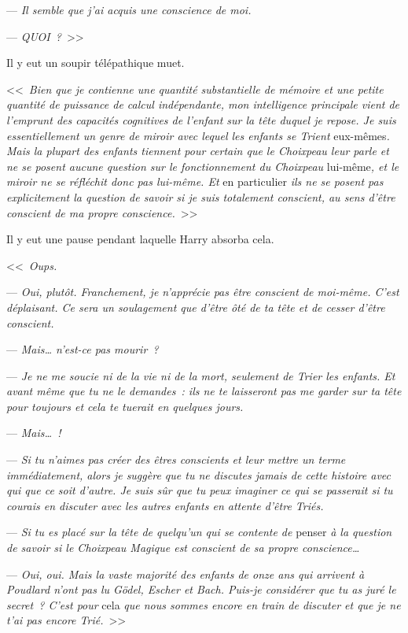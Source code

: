 

\hplettrineextrapara
--- \emph{Il semble que j'ai acquis une conscience de moi.}

--- \emph{QUOI~?}~>>

Il y eut un soupir télépathique muet.

<<~\emph{Bien que je contienne une quantité substantielle de mémoire et une petite quantité de puissance de calcul indépendante, mon intelligence principale vient de l'emprunt des capacités cognitives de l'enfant sur la tête duquel je repose. Je suis essentiellement un genre de miroir avec lequel les enfants se Trient} eux-mêmes\emph{. Mais la plupart des enfants tiennent pour certain que le Choixpeau leur parle et ne se posent aucune question sur le fonctionnement du Choixpeau} lui-même\emph{, et le miroir ne se réfléchit donc pas lui-même. Et} en particulier \emph{ils ne se posent pas explicitement la question de savoir si je suis totalement conscient, au sens d'être conscient de ma propre conscience.}~>>

Il y eut une pause pendant laquelle Harry absorba cela.

<<~\emph{Oups.}

--- \emph{Oui, plutôt. Franchement, je n'apprécie pas être conscient de moi-même. C'est déplaisant. Ce sera un soulagement que d'être ôté de ta tête et de cesser d'être conscient.}

--- \emph{Mais… n'est-ce pas mourir~?}

--- \emph{Je ne me soucie ni de la vie ni de la mort, seulement de Trier les enfants. Et avant même que tu ne le demandes~: ils ne te laisseront pas me garder sur ta tête pour toujours et cela te tuerait en quelques jours.}

--- \emph{Mais…~!}

--- \emph{Si tu n'aimes pas créer des êtres conscients et leur mettre un terme immédiatement, alors je suggère que tu ne discutes jamais de cette histoire avec qui que ce soit d'autre. Je suis sûr que tu peux imaginer ce qui se passerait si tu courais en discuter avec les autres enfants en attente d'être Triés.}

--- \emph{Si tu es placé sur la tête de quelqu'un qui se contente de} penser \emph{à la question de savoir si le Choixpeau Magique est conscient de sa propre conscience…}

--- \emph{Oui, oui. Mais la vaste majorité des enfants de onze ans qui arrivent à Poudlard n'ont pas lu Gödel, Escher et Bach. Puis-je considérer que tu as juré le secret~? C'est pour} cela \emph{que nous sommes encore en train de discuter et que je ne t'ai pas encore Trié.}~>>

